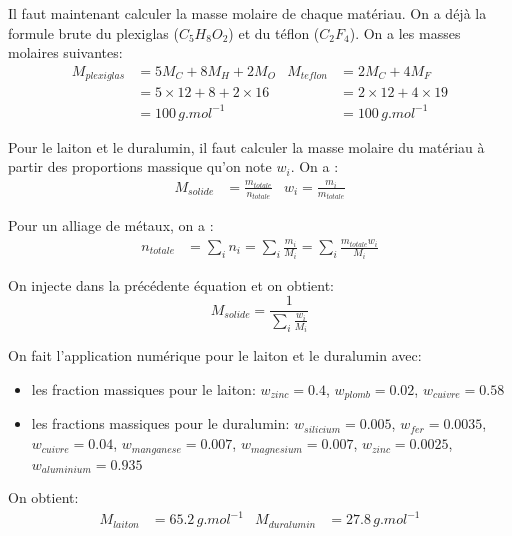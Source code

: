 \documentclass[12pt]{article}
\begin{document}
Il faut maintenant calculer la masse molaire de chaque matériau. On a déjà la formule brute du plexiglas ($C_5H_8O_2$) et du téflon ($C_2F_4$). On a les masses molaires suivantes:
\begin{align*}
M_{plexiglas}&=5M_C+8M_H+2M_O & M_{teflon}&=2M_C+4M_F  \\
&=5\times 12+8+2\times 16 & &=2\times 12+4\times 19 \\
&=100\, g.mol^{-1} & &=100\, g.mol^{-1}
\end{align*}

Pour le laiton et le duralumin, il faut calculer la masse molaire du matériau à partir des proportions massique qu'on note $w_{i}$. On a :
\begin{align*}
M_{solide}&=\frac{m_{totale}}{n_{totale}} & w_i=\frac{m_i}{m_{totale}}
\end{align*} 

Pour un alliage de métaux, on a :
\begin{align*}
n_{totale}&=\sum_{i}n_i
=\sum_i \frac{m_i}{M_i}
=\sum_i \frac{m_{totale}w_i}{M_i}
\end{align*}

On injecte dans la précédente équation et on obtient:
\begin{equation}
M_{solide}=\frac{1}{\sum_{i} \frac{w_i}{M_i}}
\end{equation}

On fait l'application numérique pour le laiton et le duralumin avec:

\begin{itemize}
	\item les fraction massiques pour le laiton: $w_{zinc}=0.4$, $w_{plomb}=0.02$, $w_{cuivre}=0.58$
	\item les fractions massiques pour le duralumin: $w_{silicium}=0.005$, $w_{fer}=0.0035$, $w_{cuivre}=0.04$, $w_{manganese}=0.007$, $w_{magnesium}=0.007$, $w_{zinc}=0.0025$, $w_{aluminium}=0.935$
\end{itemize}

On obtient:
\begin{align*}
M_{laiton}&=65.2\, g.mol^{-1} & M_{duralumin}&=27.8\, g.mol^{-1}
\end{align*}
 
\end{document}
